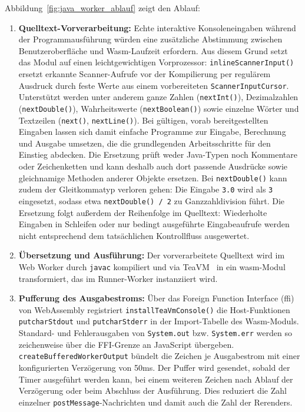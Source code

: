 Abbildung~\ref{fig:java_worker_ablauf} zeigt den Ablauf:
\begin{enumerate}
  \item \textbf{Quelltext-Vorverarbeitung:} Echte interaktive Konsoleneingaben während der Programmausführung würden eine zusätzliche Abstimmung zwischen Benutzeroberfläche und Wasm-Laufzeit erfordern. Aus diesem Grund setzt das Modul auf einen leichtgewichtigen Vorprozessor: \verb|inlineScannerInput()| ersetzt erkannte Scanner-Aufrufe vor der Kompilierung per regulärem Ausdruck durch feste Werte aus einem vorbereiteten \verb|ScannerInputCursor|. Unterstützt werden unter anderem ganze Zahlen (\texttt{nextInt()}), Dezimalzahlen (\texttt{nextDouble()}), Wahrheitswerte (\texttt{nextBoolean()}) sowie einzelne Wörter und Textzeilen (\texttt{next()}, \texttt{nextLine()}). Bei gültigen, vorab bereitgestellten Eingaben lassen sich damit einfache Programme zur Eingabe, Berechnung und Ausgabe umsetzen, die die grundlegenden Arbeitsschritte für den Einstieg abdecken. Die Ersetzung prüft weder Java-Typen noch Kommentare oder Zeichenketten und kann deshalb auch dort passende Ausdrücke sowie gleichnamige Methoden anderer Objekte ersetzen. Bei \texttt{nextDouble()} kann zudem der Gleitkommatyp verloren gehen: Die Eingabe \texttt{3.0} wird als \texttt{3} eingesetzt, sodass etwa \texttt{nextDouble() / 2} zu Ganzzahldivision führt. Die Ersetzung folgt außerdem der Reihenfolge im Quelltext: Wiederholte Eingaben in Schleifen oder nur bedingt ausgeführte Eingabeaufrufe werden nicht entsprechend dem tatsächlichen Kontrollfluss ausgewertet.
  \item \textbf{Übersetzung und Ausführung:} Der vorverarbeitete Quelltext wird im Web Worker durch \verb|javac| kompiliert und via TeaVM~\cite{teavm} in ein \gls{wasm}-Modul transformiert, das im Runner-Worker instanziiert wird.
  \item \textbf{Pufferung des Ausgabestroms:} Über das Foreign Function Interface (\gls{ffi}) von WebAssembly registriert \verb|installTeaVmConsole()| die Host-Funktionen \texttt{putcharStdout} und \texttt{putcharStderr} in der Import-Tabelle des Wasm-Moduls. Standard- und Fehlerausgaben von \texttt{System.out} bzw. \texttt{System.err} werden so zeichenweise über die FFI-Grenze an JavaScript übergeben. \texttt{createBufferedWorkerOutput} bündelt die Zeichen je Ausgabestrom mit einer konfigurierten Verzögerung von 50ms. Der Puffer wird gesendet, sobald der Timer ausgeführt werden kann, bei einem weiteren Zeichen nach Ablauf der Verzögerung oder beim Abschluss der Ausführung. Dies reduziert die Zahl einzelner \texttt{postMessage}-Nachrichten und damit auch die Zahl der Rerenders.
\end{enumerate}


